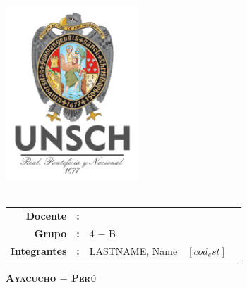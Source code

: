 \thispagestyle{empty}
\phantom{dy}
\begin{center}
	{\Large\scshape\bfseries \dyuniversity}\\
	\vspace{2.5mm}
	{\Large\scshape\bfseries \dyfaculty}\\
    \vspace{2.5mm}
	{\Large\scshape\bfseries \dydept}\\
	\vspace{8mm}
	\includegraphics[width=5cm]{src/images/logo/logounsch_a.png}\\
	
 \vspace{2pt}
	{\Large\bfseries \dycourse}\\
	\vspace{2pt}
	\vspace{5pt}

	\boxabstractd{10cm}{\bfseries\large\centering \dytema}
	\vspace{15pt}
	
 \begin{center}
		\begin{tabular}{rclcl}
			\bf Docente         & \bf: & \dyteacher{}            &   & \\[8pt]
			\bf Grupo      & \bf: &  4 $-$ B    &  & \\[5pt]
			\bf Integrantes      & \bf: &  LASTNAME, Name     & $[cod_est]$ & \\[5pt]
		\end{tabular}
	\end{center}

	\vfill
	{\Large\scshape\bfseries Ayacucho $-$ Perú}\\
	\vspace{4mm} {\Large\bfseries\dycopyrightyear}
\end{center}

\cleardoublepage{}
